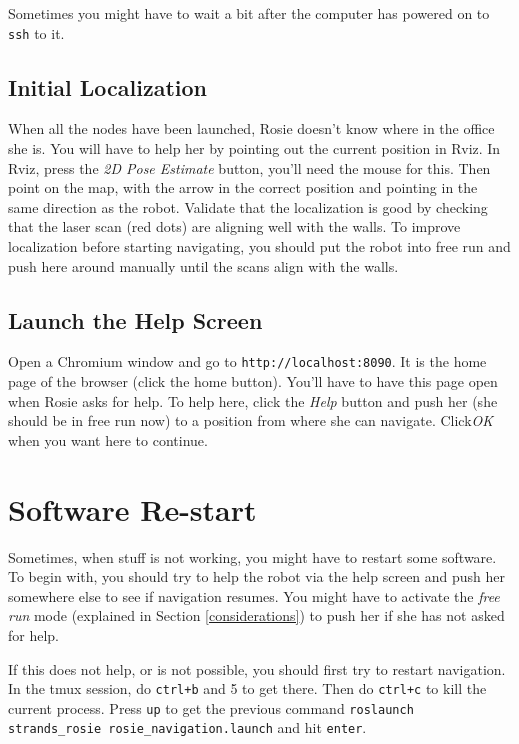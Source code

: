 \documentclass[a4paper,11pt]{article}
\begin{document}
Sometimes you might have to wait a bit after the computer has powered on
to \texttt{ssh} to it.

\subsection{Initial Localization}

When all the nodes have been launched, Rosie doesn't know where in the office
she is. You will have to help her by pointing out the current position in Rviz.
In Rviz, press the \textit{2D Pose Estimate} button, you'll need the mouse
for this. Then point on the map, with the arrow in the correct position and
pointing in the same direction as the robot. Validate that the localization is
good by checking that the laser scan (red dots) are aligning well with the walls.
To improve localization before starting navigating, you should put the robot
into free run and push here around manually until the scans align with the walls.

\subsection{Launch the Help Screen}
\label{help}

Open a Chromium window and go to \texttt{http://localhost:8090}. It is the
home page of the browser (click the home button). You'll have to have this
page open when Rosie asks for help. To help here, click the \textit{Help}
button and push her (she should be in free run now) to a position from
where she can navigate. Click\textit{OK} when you want here to continue.

\section{Software Re-start}

Sometimes, when stuff is not working, you might have to restart some software. To begin with, you should try to help the robot via the help screen and push her somewhere else to see if navigation resumes. You might have to activate the \textit{free run} mode (explained in Section \ref{considerations}) to push her if she has not asked for help.

If this does not help, or is not possible, you should first try to restart navigation. In the tmux session, do \texttt{ctrl+b} and 5 to get there. Then do \texttt{ctrl+c} to kill the current process. Press \texttt{up} to get the previous command \texttt{roslaunch strands\_rosie rosie\_navigation.launch} and hit \texttt{enter}.
\end{document}
